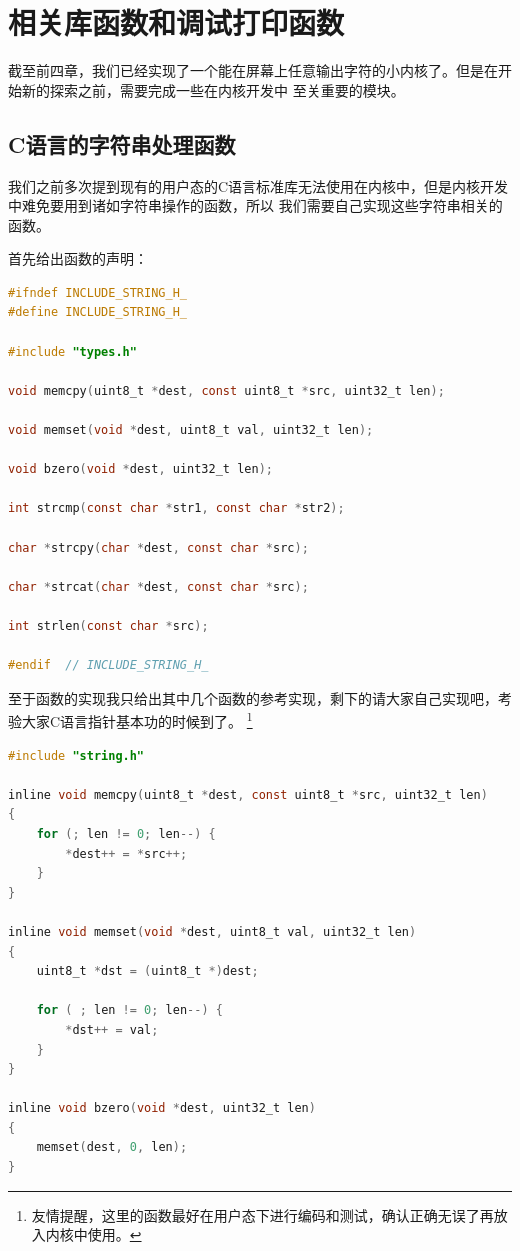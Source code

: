 
\section {相关库函数和调试打印函数}

\par 截至前四章，我们已经实现了一个能在屏幕上任意输出字符的小内核了。但是在开始新的探索之前，需要完成一些在内核开发中\allowbreak
至关重要的模块。

\subsection {C语言的字符串处理函数}

\par 我们之前多次提到现有的用户态的C语言标准库无法使用在内核中，但是内核开发中难免要用到诸如字符串操作的函数，所以\allowbreak
我们需要自己实现这些字符串相关的函数。

\par 首先给出函数的声明：

\begin{lstlisting}[language = C, caption = include/string.h]
#ifndef INCLUDE_STRING_H_
#define INCLUDE_STRING_H_

#include "types.h"

void memcpy(uint8_t *dest, const uint8_t *src, uint32_t len);

void memset(void *dest, uint8_t val, uint32_t len);

void bzero(void *dest, uint32_t len);

int strcmp(const char *str1, const char *str2);

char *strcpy(char *dest, const char *src);

char *strcat(char *dest, const char *src);

int strlen(const char *src);

#endif 	// INCLUDE_STRING_H_
\end{lstlisting}

\par 至于函数的实现我只给出其中几个函数的参考实现，剩下的请大家自己实现吧，考验大家C语言指针基本功的时候到了。\allowbreak
\footnote{友情提醒，这里的函数最好在用户态下进行编码和测试，确认正确无误了再放入内核中使用。}

\begin{lstlisting}[language = C, caption = libs/string.c]
#include "string.h"

inline void memcpy(uint8_t *dest, const uint8_t *src, uint32_t len)
{
	for (; len != 0; len--) {
		*dest++ = *src++;
	}
}

inline void memset(void *dest, uint8_t val, uint32_t len)
{
	uint8_t *dst = (uint8_t *)dest;

	for ( ; len != 0; len--) {
		*dst++ = val;
	}
}

inline void bzero(void *dest, uint32_t len)
{
	memset(dest, 0, len);
}
\end{lstlisting}

